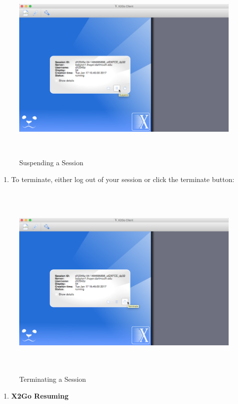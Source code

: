 \begin{figure}
	\centering
	\includegraphics[width=6.08268in,height=3.71654in]{src/images/image8.png}
	\caption{Suspending a Session}
	\label{fig:fig8}
\end{figure}
\begin{enumerate}
	\def\labelenumi{\arabic{enumi}.}
	\setcounter{enumi}{13}
	\item
	To terminate, either log out of your session or click the terminate
	button:
\end{enumerate}
\begin{figure}
	\centering
	\includegraphics[width=6.26806in,height=3.82311in]{src/images/image9.png}
	\caption{Terminating a Session}
	\label{fig:fig9}
\end{figure}
\begin{enumerate}
	\def\labelenumi{\Alph{enumi}.}
	\setcounter{enumi}{4}
	\item
	\textbf{X2Go Resuming}
\end{enumerate}

